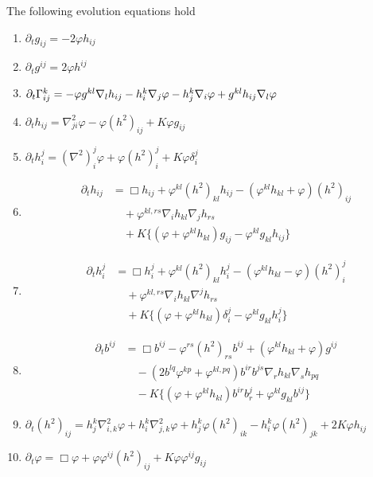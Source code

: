 \documentclass{amsart}
\begin{document}
\begin{lemma}
\label{lem:evolution}
The following evolution equations hold
\begin{enumerate}
\item \label{eq:delt_metric} $\partial_tg_{ij} = -2\varphi h_{ij}$
\item \label{eq:delt_inversemetric} $\partial_t g^{ij} = 2\varphi h^{ij}$
\item \label{eq:delt_christoffel} $\partial_t {\Gamma}^{k}_{ij} = -\varphi g^{kl} \nabla_l h_{ij} - h^k_i \nabla_j \varphi - h^k_j \nabla_i \varphi + g^{kl} h_{ij} \nabla_l \varphi$
\item \label{eq:delt_sff} $\partial_t h_{ij} = \nabla^2_{ji} \varphi - \varphi(h^2)_{ij} + K \varphi g_{ij}$
\item \label{eq:delt_weingarten} $\partial_t h_i^j = (\nabla^2)^j_i\varphi + \varphi(h^2)_i^j + K \varphi\delta_i^j$
\item \label{eq:delt_sff_box} \begin{align*}
\partial_t h_{ij} &= \Box h_{ij} + \varphi^{kl} (h^2)_{kl} h_{ij} - (\varphi^{kl}h_{kl} + \varphi) (h^2)_{ij} \\
& \quad + \varphi^{kl,rs}\nabla_i h_{kl}\nabla_j h_{rs} \\
& \quad + K \{(\varphi + \varphi^{kl}h_{kl}) g_{ij} - \varphi^{kl}g_{kl}h_{ij}\}
\end{align*}
\item \label{eq:delt_weingarten_box} \begin{align*}
\partial_t h_i^j &= \Box h_i^j + \varphi^{kl} (h^2)_{kl} h_i^j - (\varphi^{kl}h_{kl} - \varphi) (h^2)_i^j \\
& \quad + \varphi^{kl,rs}\nabla_i h_{kl}\nabla^j h_{rs} \\
& \quad + K \{(\varphi + \varphi^{kl}h_{kl}) \delta_i^j - \varphi^{kl}g_{kl}h_i^j\}
\end{align*}
\item \label{eq:delt_inversesff} \begin{align*}
\partial_t b^{ij} &= \Box b^{ij} - \varphi^{rs} (h^2)_{rs} b^{ij} + (\varphi^{kl}h_{kl} + \varphi) g^{ij} \\  
& \quad - \left(2b^{lq}\varphi^{kp} + \varphi^{kl,pq}\right) b^{ir}b^{js} \nabla_r h_{kl} \nabla_s h_{pq} \\
& \quad - K \{(\varphi + \varphi^{kl}h_{kl}) b^{ir}b^{j}_{r} + \varphi^{kl}g_{kl}b^{ij}\}
\end{align*}
\item \label{eq:delt_squaredsff} $\partial_t (h^2)_{ij} = h^k_j \nabla^2_{i,k} \varphi + h^k_i \nabla^2_{j,k} \varphi + h^k_j \varphi(h^2)_{ik} - h^k_i \varphi(h^2)_{jk} + 2K\varphi h_{ij}$
\item \label{eq:delt_speed} $\partial_t \varphi = \Box \varphi + \varphi\varphi^{ij}(h^2)_{ij} + K \varphi\varphi^{ij}g_{ij}$
\end{enumerate}
\end{lemma}
\end{document}
